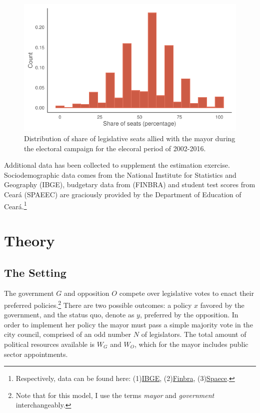 \begin{figure}
    \centering
    \includegraphics[width=0.6\linewidth]{chapters/chapter_1/plots/hist_coalition.pdf}
    \caption{Distribution of share of legislative seats allied with the mayor during the electoral campaign for the elecoral period of 2002-2016.}
    \label{fig:hist_coalition}
\end{figure}

Additional data has been collected to supplement the estimation exercise. Sociodemographic data comes from the National Institute for Statistics and Geography (IBGE), budgetary data from (FINBRA) and student test scores from Ceará (SPAEEC) are graciously provided by the Department of Education of Ceará.\footnote{Respectively, data can be found here: (1)\hyperlink{https://ces.ibge.gov.br/base-de-dados/links-base-de-dados.html}{IBGE}, (2)\hyperlink{https://siconfi.tesouro.gov.br/siconfi/pages/public/consulta_finbra/finbra_list.jsf}{Finbra}, (3)\hyperlink{https://www.seduc.ce.gov.br/spaece/}{Spaece}.}

\section{Theory}
\label{sec:theory}

\subsection*{The Setting}

The government $G$ and opposition $O$ compete over legislative votes to enact their preferred policies.\footnote{Note that for this model, I use the terms \emph{mayor} and \emph{government} interchangeably.} There are two possible outcomes: a policy $x$ favored by the government, and the status quo, denote as $y$, preferred by the opposition. In order to implement her policy the mayor must pass a simple majority vote in the city council, comprised of an odd number $N$ of legislators. The total amount of political resources available is $W_G$ and $W_O$, which for the mayor includes public sector appointments.

